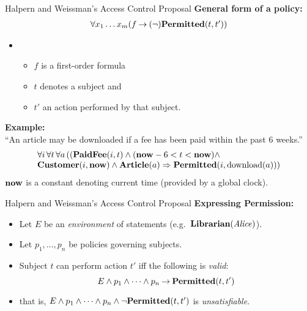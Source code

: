 \documentclass[style=sailor,size=12pt]{powerdot}
\begin{document}
\begin{wideslide}[bm=,toc=]{Halpern and Weissman's Access Control Proposal}
\textbf{General form of a policy:}
\begin{displaymath}
\begin{array}{l}
\forall x_1\ldots x_m(f \mathbin{\rightarrow} (\neg)\mbox{\bf Permitted}(t,t'))
\end{array}
\end{displaymath}
\vspace{-15mm}
\begin{itemize}
\item[] \phantom{empty bullet}
\begin{itemize}
\item $f$ is a first-order formula
\item $t$ denotes a subject and 
\item $t'$ an action performed by that subject.
\end{itemize}
\end{itemize}
\vspace{3mm}
\pause
\textbf{Example:}\\
\vspace{2mm}
``An article may be downloaded if a fee has been paid within the past 6 weeks.''
\vspace{-2mm}
\begin{displaymath}
\begin{array}{l}
\forall i\, \forall t\, \forall a\, ((\mbox{\bf PaidFee}(i,t)\wedge (\mbox{\bf now} - 6 < t < \mbox{\bf now})\wedge \\
\mbox{\bf Customer}(i,\mbox{\bf now})\wedge\mbox{\bf Article}(a) \Rightarrow \mbox{\bf Permitted}(i,\mbox{\rm download}(a)))
\end{array}
\end{displaymath}
$\mbox{\bf now}$ is a constant denoting current time (provided by a global clock).
\end{wideslide}

\begin{wideslide}[bm=,toc=]{Halpern and Weissman's Access Control Proposal}
\textbf{Expressing Permission:}
\begin{itemize}
\item<2-> Let $E$ be an {\em environment\/} of statements (e.g.\ $\mbox{\bf Librarian}(\mbox{\it Alice\/})$).
\item<3-> Let $p_1,\ldots ,p_n$ be policies governing subjects.
\item<4-> Subject $t$ can perform action $t'$ iff the following is {\em valid\/}:
\pause[4]
\begin{displaymath}
E\wedge p_1 \wedge \cdots \wedge p_n \mathbin{\rightarrow} \mbox{\bf Permitted}(t,t')
\end{displaymath}
\vspace{-5mm}
\item<6->  that is, $E\wedge p_1 \wedge \cdots \wedge p_n \wedge \neg\mbox{\bf Permitted}(t,t')$ 
is {\em unsatisfiable\/}.
\end{itemize}
\end{wideslide}
\end{document}
